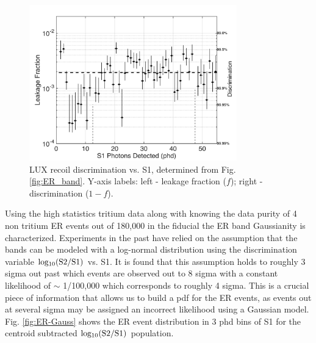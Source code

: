\begin{figure}[h!]\centering
\includegraphics[width=90mm]{fig/CH3T_Leakage_Run03.png}
\caption{LUX recoil discrimination vs. S1, determined from Fig. \ref{fig:ER_band}. Y-axis labels: left -  leakage fraction ($f$); right - discrimination ($1-f$).}
\label{fig:Leak}
\end{figure}



Using the high statistics tritium data along with knowing the data purity of 4 non tritium ER events out of 180,000 in the fiducial the ER band Gaussianity is characterized. Experiments in the past have relied on the assumption that the bands can be modeled with a log-normal distribution using the discrimination variable $\rm log_{10}(S2/S1)$ vs. S1. It is found that this assumption holds to roughly 3 sigma out past which events are observed out to 8 sigma with a constant likelihood of $\sim$ 1/100,000 which corresponds to  roughly 4 sigma. This is a crucial piece of information that allows us to build a pdf for the ER events, as events out at several sigma may be assigned an incorrect likelihood using a Gaussian model. Fig. \ref{fig:ER-Gauss} shows the ER event distribution in 3 phd bins of S1 for the centroid subtracted $\rm log_{10}(S2/S1)$ population.


